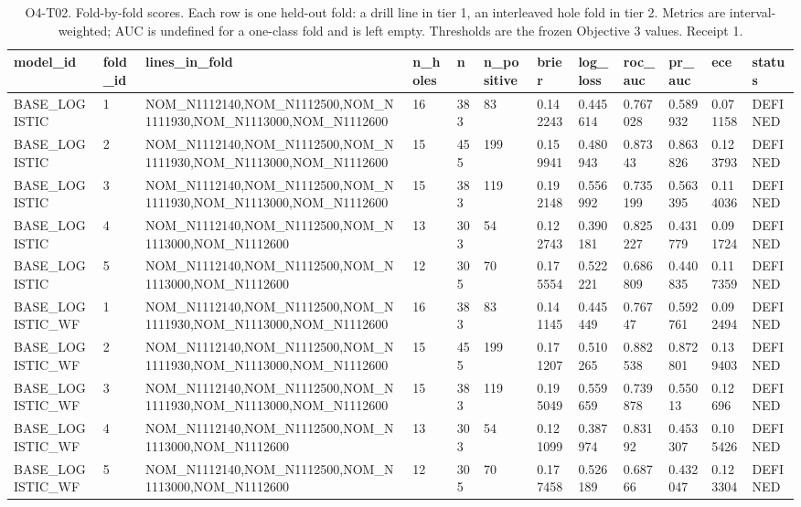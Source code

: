 \begin{table}[ht]
\centering
\scriptsize
\caption{O4-T02. Fold-by-fold scores. Each row is one held-out fold: a drill line in tier 1, an interleaved hole fold in tier 2. Metrics are interval-weighted; AUC is undefined for a one-class fold and is left empty. Thresholds are the frozen Objective 3 values. Receipt 1.}
\label{tab:O4-T02}
\begin{tabular}{llllllllllll}
\toprule
model\_id & fold\_id & lines\_in\_fold & n\_holes & n & n\_positive & brier & log\_loss & roc\_auc & pr\_auc & ece & status \\
\midrule
BASE\_LOGISTIC & 1 & NOM\_N1112140,NOM\_N1112500,NOM\_N1111930,NOM\_N1113000,NOM\_N1112600 & 16 & 383 & 83 & 0.142243 & 0.445614 & 0.767028 & 0.589932 & 0.071158 & DEFINED \\
BASE\_LOGISTIC & 2 & NOM\_N1112140,NOM\_N1112500,NOM\_N1111930,NOM\_N1113000,NOM\_N1112600 & 15 & 455 & 199 & 0.159941 & 0.480943 & 0.87343 & 0.863826 & 0.123793 & DEFINED \\
BASE\_LOGISTIC & 3 & NOM\_N1112140,NOM\_N1112500,NOM\_N1111930,NOM\_N1113000,NOM\_N1112600 & 15 & 383 & 119 & 0.192148 & 0.556992 & 0.735199 & 0.563395 & 0.114036 & DEFINED \\
BASE\_LOGISTIC & 4 & NOM\_N1112140,NOM\_N1112500,NOM\_N1113000,NOM\_N1112600 & 13 & 303 & 54 & 0.122743 & 0.390181 & 0.825227 & 0.431779 & 0.091724 & DEFINED \\
BASE\_LOGISTIC & 5 & NOM\_N1112140,NOM\_N1112500,NOM\_N1113000,NOM\_N1112600 & 12 & 305 & 70 & 0.175554 & 0.522221 & 0.686809 & 0.440835 & 0.117359 & DEFINED \\
BASE\_LOGISTIC\_WF & 1 & NOM\_N1112140,NOM\_N1112500,NOM\_N1111930,NOM\_N1113000,NOM\_N1112600 & 16 & 383 & 83 & 0.141145 & 0.445449 & 0.76747 & 0.592761 & 0.092494 & DEFINED \\
BASE\_LOGISTIC\_WF & 2 & NOM\_N1112140,NOM\_N1112500,NOM\_N1111930,NOM\_N1113000,NOM\_N1112600 & 15 & 455 & 199 & 0.171207 & 0.510265 & 0.882538 & 0.872801 & 0.139403 & DEFINED \\
BASE\_LOGISTIC\_WF & 3 & NOM\_N1112140,NOM\_N1112500,NOM\_N1111930,NOM\_N1113000,NOM\_N1112600 & 15 & 383 & 119 & 0.195049 & 0.559659 & 0.739878 & 0.55013 & 0.12696 & DEFINED \\
BASE\_LOGISTIC\_WF & 4 & NOM\_N1112140,NOM\_N1112500,NOM\_N1113000,NOM\_N1112600 & 13 & 303 & 54 & 0.121099 & 0.387974 & 0.83192 & 0.453307 & 0.105426 & DEFINED \\
BASE\_LOGISTIC\_WF & 5 & NOM\_N1112140,NOM\_N1112500,NOM\_N1113000,NOM\_N1112600 & 12 & 305 & 70 & 0.177458 & 0.526189 & 0.68766 & 0.432047 & 0.123304 & DEFINED \\

\end{tabular}
\end{table}
